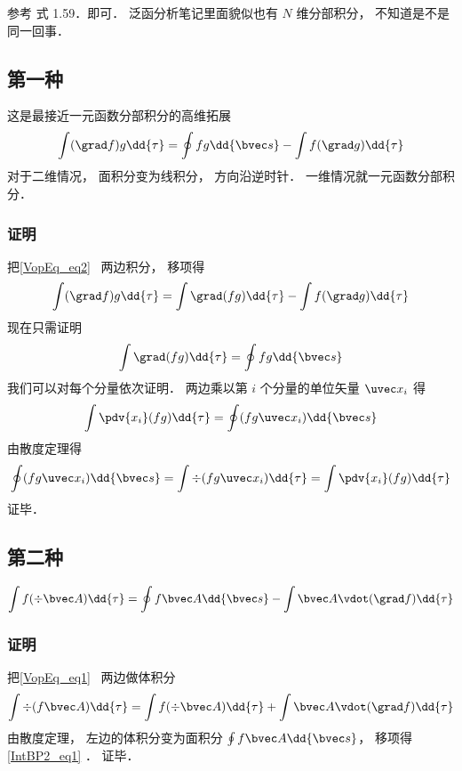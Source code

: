 
\begin{issues}
\issueDraft
\end{issues}


参考\cite{GriffE} 式 1.59．即可． 泛函分析笔记里面貌似也有 $N$ 维分部积分， 不知道是不是同一回事．

\subsection{第一种}
这是最接近一元函数分部积分的高维拓展
\begin{equation}
\int (\grad f) g \dd{\tau} = \oint fg \dd{\bvec s} - \int f (\grad g) \dd{\tau}
\end{equation}
对于二维情况， 面积分变为线积分， 方向沿逆时针． 一维情况就一元函数分部积分．

\subsubsection{证明}
把\autoref{VopEq_eq2}~ 两边积分， 移项得
\begin{equation}
\int (\grad f) g \dd{\tau} = \int \grad (fg) \dd{\tau} - \int f (\grad g) \dd{\tau}
\end{equation}
现在只需证明
\begin{equation}
\int \grad (fg) \dd{\tau} = \oint fg \dd{\bvec s}
\end{equation}
我们可以对每个分量依次证明． 两边乘以第 $i$ 个分量的单位矢量 $\uvec x_i$ 得
\begin{equation}
\int \pdv{x_i}(fg) \dd{\tau} = \oint (fg\uvec x_i) \dd{\bvec s}
\end{equation}
由散度定理得
\begin{equation}
\oint (fg\uvec x_i) \dd{\bvec s} = \int \div (fg\uvec x_i) \dd{\tau} = \int \pdv{x_i}(fg) \dd{\tau}
\end{equation}
证毕．

\subsection{第二种}
\begin{equation}\label{IntBP2_eq1}
\int f (\div \bvec A)\dd{\tau} =  \oint f \bvec A \dd{\bvec s} - \int\bvec A \vdot (\grad f)\dd{\tau}
\end{equation}

\subsubsection{证明}
把\autoref{VopEq_eq1}~ 两边做体积分
\begin{equation}
\int\div (f \bvec A) \dd{\tau} = \int f (\div \bvec A)\dd{\tau} + \int\bvec A \vdot (\grad f)\dd{\tau}
\end{equation}
由散度定理， 左边的体积分变为面积分 $\oint f \bvec A \dd{\bvec s}$， 移项得\autoref{IntBP2_eq1} ． 证毕．
